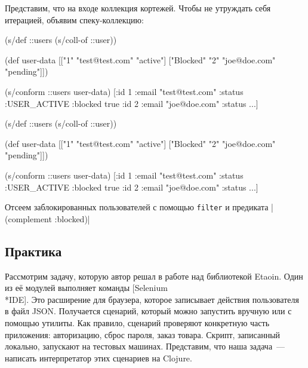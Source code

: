Представим, что на входе коллекция кортежей. Чтобы не утруждать себя итерацией,
объявим спеку-коллекцию:

\ifx\DEVICETYPE\MOBILE

\begin{english}
  \begin{clojure}
(s/def ::users (s/coll-of ::user))

(def user-data
  [["1" "test@test.com" "active"]
   ["Blocked" "2" "joe@doe.com"
    "pending"]])

(s/conform ::users user-data)
[{:id 1
  :email "test@test.com"
  :status :USER_ACTIVE}
 {:blocked true
  :id 2
  :email "joe@doe.com"
  :status ...}]
  \end{clojure}
\end{english}

\else

\begin{english}
  \begin{clojure}
(s/def ::users (s/coll-of ::user))

(def user-data
  [["1" "test@test.com" "active"]
   ["Blocked" "2" "joe@doe.com" "pending"]])

(s/conform ::users user-data)
[{:id 1 :email "test@test.com" :status :USER_ACTIVE}
 {:blocked true :id 2 :email "joe@doe.com" :status ...}]
  \end{clojure}
\end{english}

\fi


Отсеем заблокированных пользователей с помощью \verb|filter| и предиката
\spverb|(complement :blocked)|

\subsection{Практика}


Рассмотрим задачу, которую автор решал в работе над библиотекой Etaoin. Один из
её модулей выполняет команды [Selenium\\*IDE].
Это расширение для браузера, которое записывает действия пользователя в файл
JSON. Получается сценарий, который можно запустить вручную или с помощью
утилиты. Как правило, сценарий проверяют конкретную часть приложения:
авторизацию, сброс пароля, заказ товара. Скрипт, записанный локально, запускают
на тестовых машинах. Представим, что наша задача~--- написать интерпретатор этих сценариев на Clojure.

